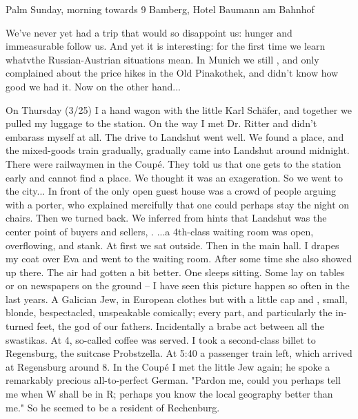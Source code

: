 \documentclass{article}
\begin{document}
\date{March 28, 1920}
Palm Sunday, morning towards 9
Bamberg, Hotel Baumann am Bahnhof

We've never yet had a trip that would so disappoint us: hunger and immeasurable  follow us. And yet it is interesting: for the first time we learn whatvthe Russian-Austrian situations mean. In Munich we still , and only complained about the price hikes in the Old Pinakothek, and didn't know how good we had it. Now on the other hand...

On Thursday (3/25) I  a hand wagon with the little Karl Sch\"afer, and together we pulled my luggage to the station. On the way I met Dr. Ritter and didn't embarass myself at all. The drive to Landshut went well. We found a place, and the mixed-goods train gradually, gradually came into Landshut around midnight. There were railwaymen in the Coup\'e. They told us that one gets to the station early and cannot find a place. We thought it was an exageration. So we went to the city... In front of the only open guest house was a crowd of people arguing with a porter, who explained mercifully that one could perhaps stay the night on chairs. Then we turned back. We inferred from hints that Landshut was the center point of  buyers and sellers, . ...a 4th-class waiting room was open, overflowing, and stank. At first we sat outside. Then in the main hall. I drapes my coat over Eva and went to the waiting room. After some time she also showed up there. The air had gotten a bit better. One sleeps sitting. Some lay on tables or on newspapers on the ground -- I have seen this picture happen so often in the last years. A Galician Jew, in European clothes but with a little cap and , small, blonde, bespectacled,  unspeakable comically; every part, and particularly the in-turned feet,  the god of our fathers. Incidentally a brabe act between all the swastikas. At 4, so-called coffee was served. I took a second-class billet to Regensburg,  the suitcase  Probstzella. At 5:40 a passenger train left, which arrived at Regensburg around 8. In the Coup\'e I met the little Jew again; he spoke a remarkably precious all-to-perfect German. "Pardon me, could you perhaps tell me when W shall be in R; perhaps you know the local geography better than me." So he seemed to be a resident of Rechenburg.
\end{document}
